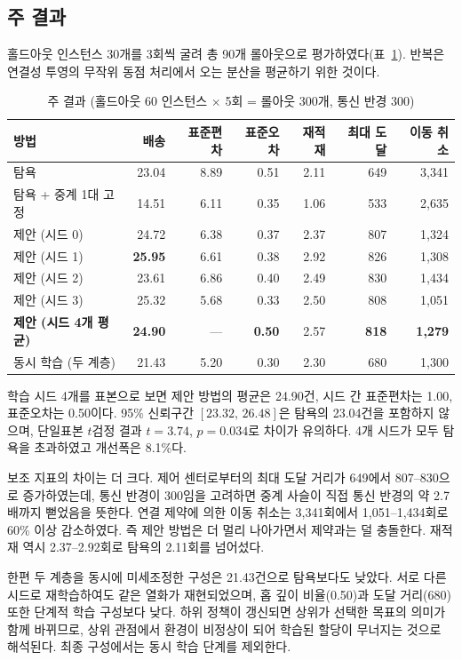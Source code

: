 \documentclass[12pt]{article}
\begin{document}
\subsection{주 결과}

홀드아웃 인스턴스 30개를 3회씩 굴려 총 90개 롤아웃으로 평가하였다(표~\ref{tab:main}).
반복은 연결성 투영의 무작위 동점 처리에서 오는 분산을 평균하기 위한 것이다.

\begin{table}[h]
\centering
\caption{주 결과 (홀드아웃 60 인스턴스 $\times$ 5회 = 롤아웃 300개, 통신 반경 300)}
\label{tab:main}
\begin{tabular}{lrrrrrr}
\toprule
방법 & 배송 & 표준편차 & 표준오차 & 재적재 & 최대 도달 & 이동 취소 \\
\midrule
탐욕 & 23.04 & 8.89 & 0.51 & 2.11 & 649 & 3{,}341 \\
탐욕 + 중계 1대 고정 & 14.51 & 6.11 & 0.35 & 1.06 & 533 & 2{,}635 \\
제안 (시드 0) & 24.72 & 6.38 & 0.37 & 2.37 & 807 & 1{,}324 \\
제안 (시드 1) & \textbf{25.95} & 6.61 & 0.38 & 2.92 & 826 & 1{,}308 \\
제안 (시드 2) & 23.61 & 6.86 & 0.40 & 2.49 & 830 & 1{,}434 \\
제안 (시드 3) & 25.32 & 5.68 & 0.33 & 2.50 & 808 & 1{,}051 \\
\textbf{제안 (시드 4개 평균)} & \textbf{24.90} & --- & \textbf{0.50} & 2.57 & \textbf{818} & \textbf{1{,}279} \\
동시 학습 (두 계층) & 21.43 & 5.20 & 0.30 & 2.30 & 680 & 1{,}300 \\
\bottomrule
\end{tabular}
\end{table}

학습 시드 4개를 표본으로 보면 제안 방법의 평균은 24.90건, 시드 간 표준편차는 1.00, 표준오차는
0.50이다. 95\% 신뢰구간 $[23.32,\,26.48]$은 탐욕의 23.04건을 포함하지 않으며, 단일표본 $t$검정
결과 $t=3.74$, $p=0.034$로 차이가 유의하다. 4개 시드가 모두 탐욕을 초과하였고 개선폭은 8.1\%다.

보조 지표의 차이는 더 크다. 제어 센터로부터의 최대 도달 거리가 649에서 807--830으로 증가하였는데,
통신 반경이 300임을 고려하면 중계 사슬이 직접 통신 반경의 약 2.7배까지 뻗었음을 뜻한다.
연결 제약에 의한 이동 취소는 3,341회에서 1,051--1,434회로 60\% 이상 감소하였다. 즉 제안 방법은
더 멀리 나아가면서 제약과는 덜 충돌한다. 재적재 역시 2.37--2.92회로 탐욕의 2.11회를 넘어섰다.

한편 두 계층을 동시에 미세조정한 구성은 21.43건으로 탐욕보다도 낮았다. 서로 다른 시드로
재학습하여도 같은 열화가 재현되었으며, 홉 깊이 비율(0.50)과 도달 거리(680) 또한 단계적 학습
구성보다 낮다. 하위 정책이 갱신되면 상위가 선택한 목표의 의미가 함께 바뀌므로, 상위 관점에서
환경이 비정상이 되어 학습된 할당이 무너지는 것으로 해석된다. 최종 구성에서는 동시 학습 단계를
제외한다.
\end{document}
